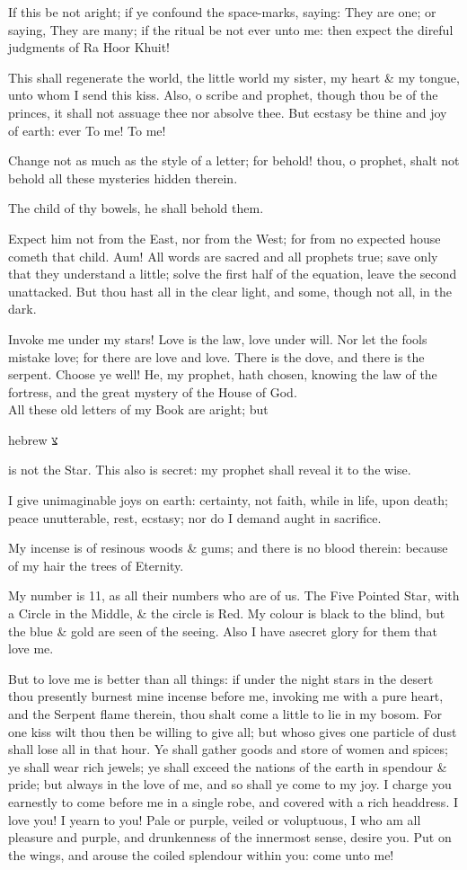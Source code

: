 If this be not aright; if ye confound the space-marks, saying: They are one; or saying, They are many; if the ritual be not ever unto me: then expect the direful judgments of Ra Hoor Khuit!

This shall regenerate the world, the little world my sister, my heart \& my tongue, unto whom I send this kiss. Also, o scribe and prophet, though thou be of the princes, it shall not assuage thee nor absolve thee. But ecstasy be thine and joy of earth: ever To me! To me!

Change not as much as the style of a letter; for behold! thou, o prophet, shalt not behold all these mysteries hidden therein.

The child of thy bowels, he shall behold them.

Expect him not from the East, nor from the West; for from no expected house cometh that child. Aum! All words are sacred and all prophets true; save only that they understand a little; solve the first half of the equation, leave the second unattacked. But thou hast all in the clear light, and some, though not all, in the dark.

Invoke me under my stars! Love is the law, love under will. Nor let the fools mistake love; for there are love and love. There is the dove, and there is the serpent. Choose ye well! He, my prophet, hath chosen, knowing the law of the fortress, and the great mystery of the House of God.
\\
All these old letters of my Book are aright; but 
\begin{otherlanguage*}{hebrew}
צ
\end{otherlanguage*} 
is not the Star. This also is secret: my prophet shall reveal it to the wise.

I give unimaginable joys on earth: certainty, not faith, while in life, upon death; peace unutterable, rest, ecstasy; nor do I demand aught in sacrifice.

My incense is of resinous woods \& gums; and there is no blood therein: because of my hair the trees of Eternity.

My number is 11, as all their numbers who are of us. The Five Pointed Star, with a Circle in the Middle, \& the circle is Red. My colour is black to the blind, but the blue \& gold are seen of the seeing. Also I have asecret glory for them that love me.

But to love me is better than all things: if under the night stars in the desert thou presently burnest mine incense before me, invoking me with a pure heart, and the Serpent flame therein, thou shalt come a little to lie in my bosom. For one kiss wilt thou then be willing to give all; but whoso gives one particle of dust shall lose all in that hour. Ye shall gather goods and store of women and spices; ye shall wear rich jewels; ye shall exceed the nations of the earth in spendour \& pride; but always in the love of me, and so shall ye come to my joy. I charge you earnestly to come before me in a single robe, and covered with a rich headdress. I love you! I yearn to you! Pale or purple, veiled or voluptuous, I who am all pleasure and purple, and drunkenness of the innermost sense, desire you. Put on the wings, and arouse the coiled splendour within you: come unto me!

